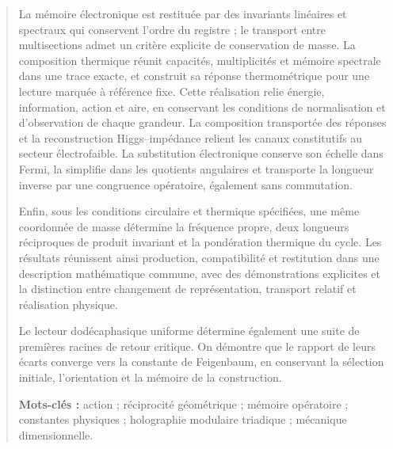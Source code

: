 \begin{abstract}
La mémoire électronique est restituée par des invariants linéaires et
spectraux qui conservent l’ordre du registre ; le transport entre
multisections admet un critère explicite de conservation de masse.
La composition thermique réunit capacités, multiplicités et mémoire
spectrale dans une trace exacte, et construit sa réponse thermométrique
pour une lecture marquée à référence fixe. Cette réalisation relie
énergie, information, action et aire, en conservant les conditions de
normalisation et d’observation de chaque grandeur.
La composition transportée des réponses et la reconstruction
Higgs--impédance relient les canaux constitutifs au secteur
électrofaible. La substitution électronique conserve son échelle dans Fermi,
la simplifie dans les quotients angulaires et transporte la longueur inverse
par une congruence opératoire, également sans commutation.

Enfin, sous les
conditions circulaire et thermique spécifiées, une même coordonnée de masse
détermine la fréquence propre, deux longueurs réciproques de produit
invariant et la pondération thermique du cycle. Les résultats réunissent ainsi
production, compatibilité et restitution dans une description mathématique
commune, avec des démonstrations explicites et la distinction entre changement de
représentation, transport relatif et réalisation physique.


Le lecteur dodécaphasique uniforme détermine également une suite de premières racines de retour critique. On démontre que le rapport de leurs écarts converge vers la constante de Feigenbaum, en conservant la sélection initiale, l’orientation et la mémoire de la construction.



\par\smallskip\noindent\textbf{Mots-clés :} action ; réciprocité géométrique ; mémoire opératoire ; constantes physiques ; holographie modulaire triadique ; mécanique dimensionnelle.
\end{abstract}


\endgroup
